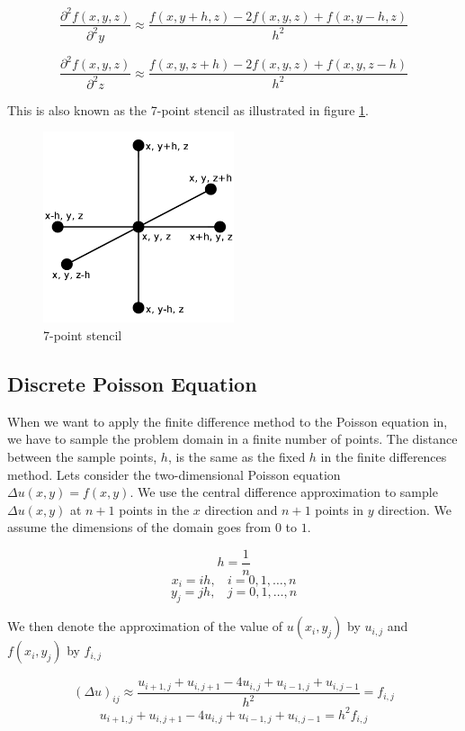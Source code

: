 $$\frac{\partial^2 f(x, y, z)}{\partial^2 y} \approx \frac{f(x, y+h, z) - 2f(x, y, z) + f(x, y-h, z)}{h^2}$$

$$\frac{\partial^2 f(x, y, z)}{\partial^2 z} \approx \frac{f(x, y, z+h) - 2f(x, y, z) + f(x, y, z-h)}{h^2}$$

This is also known as the 7-point stencil as illustrated in figure \ref{7ps}.

\begin{figure}[ht]
	\center
	\includegraphics[width=0.5\textwidth]{images/7_point_stencil}
	\caption{7-point stencil}
	\label{7ps}
\end{figure}


\subsection*{Discrete Poisson Equation}

When we want to apply the finite difference method to the Poisson equation in,
we have to sample the problem domain in a finite number of points. The distance
between the sample points, $h$, is the same as the fixed $h$ in the finite
differences method. Lets consider the two-dimensional Poisson equation $\Delta
u(x, y) = f(x, y)$. We use the central difference approximation to sample
$\Delta u(x, y)$ at $n+1$ points in the $x$ direction and $n+1$ points in $y$
direction. We assume the dimensions of the domain goes from $0$ to $1$.

$$h = \frac{1}{n}$$
$$x_i = ih, ~~~~ i = 0, 1, \dots, n$$
$$y_j = jh, ~~~~ j = 0, 1, \dots, n$$

We then denote the approximation of the value of $u(x_i, y_j)$ by $u_{i,j}$ and 
$f(x_i, y_j)$ by $f_{i,j}$

$$ (\Delta u)_{ij} \approx \frac{u_{i+1,j} + u_{i,j+1} - 4u_{i,j} + u_{i-1,j} + u_{i,j-1}}{h^2} = f_{i,j} $$
$$ u_{i+1,j} + u_{i,j+1} - 4u_{i,j} + u_{i-1,j} + u_{i,j-1} = h^2 f_{i,j} $$


